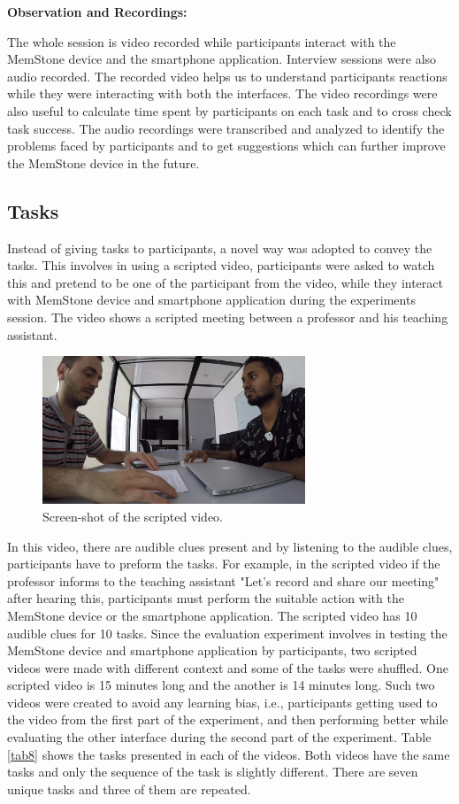 \documentclass[mscthesis]{usiinfthesis}
\begin{document}
\textbf{Observation and Recordings:}

The whole session is video recorded while participants interact with the MemStone device and the smartphone application. Interview sessions were also audio recorded. The recorded video helps us to understand participants reactions while they were interacting with both the interfaces. The video recordings were also useful to calculate time spent by participants on each task and to cross check task success. The audio recordings were transcribed and analyzed to identify the problems faced by participants and to get suggestions which can further improve the MemStone device in the future.
 
\subsection{Tasks}
Instead of giving tasks to participants, a novel way was adopted to convey the tasks. This involves in using a scripted video, participants were asked to watch this and pretend to be one of the participant from the video, while they interact with MemStone device and smartphone application during the experiments session. The video shows a scripted meeting between a professor and his teaching assistant.

\begin{figure}[!ht]
  \centering
  \includegraphics[width=0.7\textwidth]{videot}
  \caption{Screen-shot of the scripted video.}
  \label{fig21}
\end{figure}

In this video, there are audible clues present and by listening to the audible clues, participants have to preform the tasks. For example, in the scripted video if the professor informs to the teaching assistant "Let's record and share our meeting" after hearing this, participants must perform the suitable action with the MemStone device or the smartphone application. The scripted video has 10 audible clues for 10 tasks. Since the evaluation experiment involves in testing the MemStone device and smartphone application by participants, two scripted videos were made with different context and some of the tasks were shuffled. One scripted video is 15 minutes long and the another is 14 minutes long. Such two videos were created to avoid any learning bias, i.e., participants getting used to the video from the first part of the experiment, and then performing better while evaluating the other interface during the second part of the experiment. Table \ref{tab8} shows the tasks presented in each of the videos. Both videos have the same tasks and only the sequence of the task is slightly different. There are seven unique tasks and three of them are repeated. 
\end{document}
